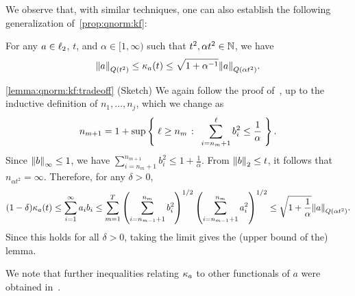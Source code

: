 We observe that, with similar techniques, one can also establish the following generalization of~\cref{prop:qnorm:kf}:
\begin{lemma}\label{lemma:qnorm:kf:tradeoff}
  For any $a\in\lp[2]$, $t$, and $\alpha\in[1,\infty)$ such that $t^2, \alpha t^2\in\N$, we have
  \begin{equation}\label{eq:qnorm:kf:tradeoff}
    \norm{a}_{Q(t^2)} \leq \kf{a}(t) \leq \sqrt{1+\alpha^{-1}}\norm{a}_{Q(\alpha t^2)}.
  \end{equation}
\end{lemma}
\begin{proofof}{\cref{lemma:qnorm:kf:tradeoff} (Sketch)}
  We again follow the proof of~\cite[Lemma 2.2]{Astashkin:2010}, up to the inductive definition of $n_1,\dots,n_j$, which we change as
  \[
      n_{m+1} = 1 + \sup\setOfSuchThat{ \ell \geq n_m }{ \sum_{i=n_m+1}^\ell b_i^2 \leq \frac{1}{\alpha}  }.
  \]
  Since $\norminf{b}\leq 1$, we have $\sum_{i=n_m+1}^{n_{m+1}} b_i^2 \leq 1+\frac{1}{\alpha}$. From $\normtwo{b}\leq t$, it follows that $n_{\alpha t^2} = \infty$. Therefore, for any $\delta >0$,
  \[
      (1-\delta)\kf{a}(t) \leq \sum_{i=1}^\infty a_ib_i \leq \sum_{m=1}^{T} \left(\sum_{i=n_{m-1}+1}^{n_{m}} b_i^2\right)^{1/2}\left(\sum_{i=n_{m-1}+1}^{n_{m}} a_i^2\right)^{1/2}
      \leq \sqrt{1+\frac{1}{\alpha}} \norm{a}_{Q(\alpha t^2)}.
  \]
  Since this holds for all $\delta>0$, taking the limit gives the (upper bound of the) lemma.
\end{proofof}

We note that further inequalities relating $\kf{a}$ to other functionals of $a$ were obtained in~\cite{HK:94}.

